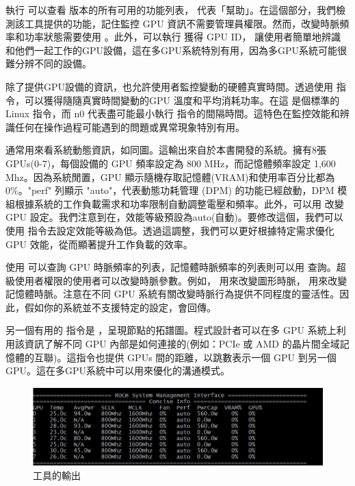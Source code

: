 執行  可以查看  版本的所有可用的功能列表， 代表「幫助」。在這個部分，我們檢測該工具提供的功能，記住監控 GPU 資訊不需要管理員權限。然而，改變時脈頻率和功率狀態需要使用 。此外，可以執行 獲得 GPU ID， 讓使用者簡單地辨識和他們一起工作的GPU設備，這在多GPU系統特別有用，因為多GPU系統可能很難分辨不同的設備。

除了提供GPU設備的資訊，也允許使用者監控變動的硬體真實時間。透過使用  指令，可以獲得隨隨真實時間變動的GPU 溫度和平均消耗功率。在這  是個標準的 Linux 指令，而 n0 代表盡可能最小執行  指令的間隔時間。這特色在監控效能和辨識任何在操作過程可能遇到的問題或異常現象特別有用。

通常用來看系統動態資訊，如同圖。這輸出來自於本書開發的系統。擁有8張GPUs(0-7)，每個設備的 GPU 頻率設定為 800 MHz，而記憶體頻率設定 1,600 Mhz。因為系統閒置，GPU 顯示隨機存取記憶體(VRAM)和使用率百分比都為0\%。"perf" 列顯示 "auto"，代表動態功耗管理 (DPM) 的功能已經啟動，DPM 模組根據系統的工作負載需求和功率限制自動調整電壓和頻率。此外，可以用 改變 GPU 設定。我們注意到在，效能等級預設為auto(自動)。要修改這個，我們可以使用 指令去設定效能等級為低。透過這調整，我們可以更好根據特定需求優化 GPU 效能，從而顯著提升工作負載的效率。

使用  可以查詢 GPU 時脈頻率的列表，記憶體時脈頻率的列表則可以用  查詢。超級使用者權限的使用者可以改變時脈參數。例如，  用來改變圖形時脈， 用來改變記憶體時脈。注意在不同 GPU 系統有關改變時脈行為提供不同程度的靈活性。因此，假如你的系統並不支援特定的設定，會回傳。

另一個有用的  指令是 ，呈現節點的拓譜圖。程式設計者可以在多 GPU 系統上利用該資訊了解不同 GPU 內部是如何連接的(例如：PCIe 或 AMD 的晶片間全域記憶體的互聯)。這指令也提供 GPUs 間的距離，以跳數表示一個 GPU 到另一個 GPU。這在多GPU系統中可以用來優化的溝通模式。

\begin{figure}
    \centering
    \includegraphics[width=0.75\linewidth]{FileAusiliari/Screenshots/Figure7-4.png}
    \caption{工具的輸出}
    \label{fig:Output of the ROCm SMI tool}
\end{figure}


